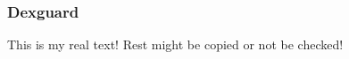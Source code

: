 \subsubsection{Dexguard} \label{subsubsection:evaluation-reengineering-optobf-dexguard}
This is my real text! Rest might be copied or not be checked!
